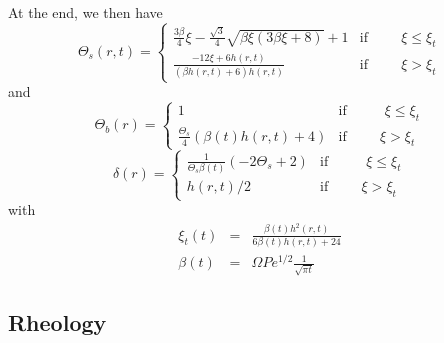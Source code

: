 At the end, we then have
\begin{equation}
  \Theta_s(r,t)=
  \begin{cases}
    \frac{3 \beta}{4} \xi - \frac{\sqrt{3}}{4} \sqrt{\beta \xi \left(3 \beta \xi + 8\right)} + 1 & \text{if} \hspace{1cm} \xi\leq \xi_t \\
    \frac{- 12  \xi +  6 h{\left  (r,t \right  )}}{\left(\beta h{\left
            (r,t  \right  )} +  6\right)  h{\left  (r,t \right  )}}  &
    \text{if} \hspace{1cm} \xi > \xi_t
  \end{cases}
  \label{C4-TS}
\end{equation}
and
\begin{equation}
  \Theta_b(r)=
  \begin{cases}
    1 &\text{if } \hspace{1cm} \xi\leq \xi_t \\
    \frac{\Theta_{s}}{4}  \left(\beta(t)  h{\left  (r,t  \right  )}  +
      4\right) & \text{if} \hspace{1cm} \xi > \xi_t
  \end{cases}
  \label{C4-TB}
\end{equation}
\begin{equation}
  \delta(r)=
  \begin{cases}
    \frac{1}{\Theta_{s} \beta(t)} \left(- 2 \Theta_{s} + 2\right) &\text{if } \hspace{1cm} \xi\leq \xi_t \\
    h(r,t)/2 & \text{if} \hspace{1cm} \xi > \xi_t
  \end{cases}
  \label{C4-DELTA}
\end{equation}
with
\begin{eqnarray}
  \xi_t(t)&=&\frac{\beta(t) h^{2}{\left (r,t \right )}}{6 \beta(t) h{\left (r,t \right )}
              + 24}\\
  \beta(t) &=& \Omega Pe^{1/2}\frac{1}{\sqrt{\pi t}}
\end{eqnarray}

\subsection{Rheology}
\label{C4-sec:rheology}

